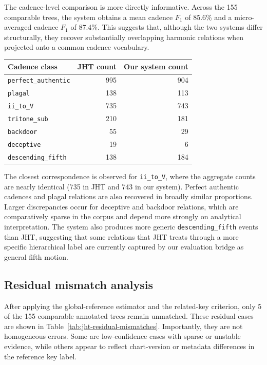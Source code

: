 The cadence-level comparison is more directly informative. Across the 155
comparable trees, the system obtains a mean cadence $F_1$ of 85.6\% and a
micro-averaged cadence $F_1$ of 87.4\%. This suggests that, although the two
systems differ structurally, they recover substantially overlapping harmonic
relations when projected onto a common cadence vocabulary.

\begin{center}
\begin{tabular}{lrr}
\hline
Cadence class & JHT count & Our system count \\
\hline
\texttt{perfect\_authentic} & 995 & 904 \\
\texttt{plagal} & 138 & 113 \\
\texttt{ii\_to\_V} & 735 & 743 \\
\texttt{tritone\_sub} & 210 & 181 \\
\texttt{backdoor} & 55 & 29 \\
\texttt{deceptive} & 19 & 6 \\
\texttt{descending\_fifth} & 138 & 184 \\
\hline
\end{tabular}
\end{center}

The closest correspondence is observed for \texttt{ii\_to\_V}, where the
aggregate counts are nearly identical (735 in JHT and 743 in our system).
Perfect authentic cadences and plagal relations are also recovered in broadly
similar proportions. Larger discrepancies occur for deceptive and backdoor
relations, which are comparatively sparse in the corpus and depend more
strongly on analytical interpretation. The system also produces more generic
\texttt{descending\_fifth} events than JHT, suggesting that some relations that
JHT treats through a more specific hierarchical label are currently captured by
our evaluation bridge as general fifth motion.

\subsection{Residual mismatch analysis}

After applying the global-reference estimator and the related-key criterion,
only 5 of the 155 comparable annotated trees remain unmatched. These residual
cases are shown in Table~\ref{tab:jht-residual-mismatches}. Importantly, they
are not homogeneous errors. Some are low-confidence cases with sparse or
unstable evidence, while others appear to reflect chart-version or metadata
differences in the reference key label.


